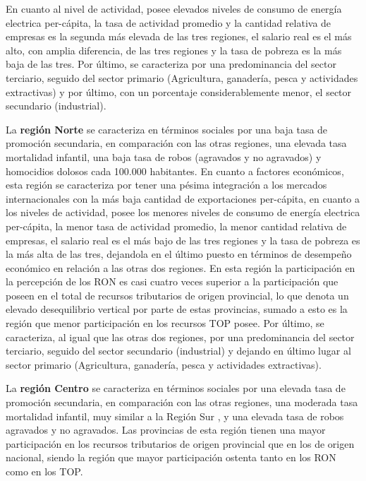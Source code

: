 \documentclass[12pt,a4paper]{article}
\begin{document}
En cuanto al nivel de actividad, posee elevados niveles de consumo  de energía electrica per-cápita, la tasa de actividad promedio y la cantidad relativa de empresas es la segunda más elevada de las tres regiones, el salario real es el más alto, con amplia diferencia, de las tres regiones y la tasa de pobreza es la más baja de las tres. Por último, se caracteriza por una predominancia del sector terciario, seguido del sector primario (Agricultura, ganadería, pesca y actividades extractivas) y por último, con un porcentaje considerablemente menor, el sector secundario (industrial).

La \textbf{región Norte} se caracteriza en términos sociales por una baja tasa de promoción secundaria, en comparación con las otras regiones, una elevada tasa mortalidad infantil, una baja tasa de robos (agravados y no agravados) y homocidios dolosos cada 100.000 habitantes.
En cuanto a factores económicos, esta región se caracteriza por tener una pésima integración a los mercados internacionales con la más baja cantidad de exportaciones per-cápita, en cuanto a los niveles de actividad, posee los menores niveles de consumo  de energía electrica per-cápita, la menor tasa de actividad promedio, la menor cantidad relativa de empresas, el salario real es el más bajo de las tres regiones y la tasa de pobreza es la más alta de las tres, dejandola en el último puesto en términos de desempeño económico en relación a las otras dos regiones. 
En esta región la participación en la percepción de los RON es casi cuatro veces superior a la participación que poseen en el total de recursos tributarios de origen provincial, lo que denota un elevado desequilibrio vertical por parte de estas provincias, sumado a esto es la región que menor participación en los recursos TOP posee.
Por último, se caracteriza, al igual que las otras dos regiones, por una predominancia del sector terciario, seguido del sector secundario (industrial) y dejando en último lugar al sector primario (Agricultura, ganadería, pesca y actividades extractivas).

La \textbf{región Centro} se caracteriza en términos sociales por una elevada tasa de promoción secundaria, en comparación con las otras regiones, una moderada tasa mortalidad infantil, muy similar a la Región Sur , y una elevada tasa de robos agravados y no agravados. Las provincias de esta región tienen una mayor participación en los recursos tributarios de origen provincial que en los de origen nacional, siendo la región que mayor participación ostenta tanto en los RON como en los TOP.
\end{document}
